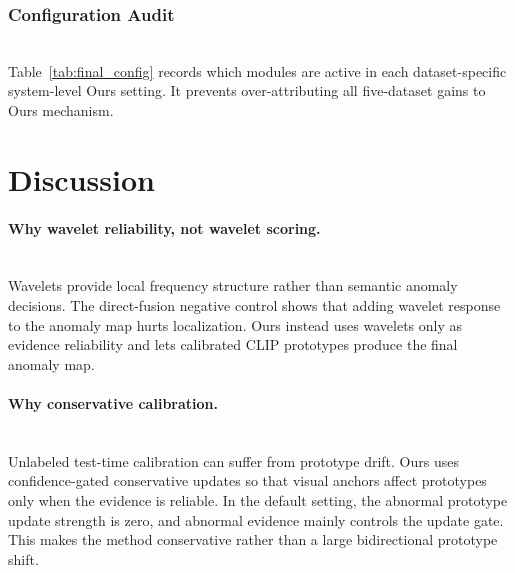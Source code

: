 \documentclass[runningheads]{llncs}
\begin{document}
\subsubsection{Configuration Audit}
\mbox{}\\
\noindent
Table~\ref{tab:final_config} records which modules are active in each dataset-specific system-level Ours setting. It prevents over-attributing all five-dataset gains to Ours mechanism.

\begin{table}[htbp]
  \centering
  \caption{Configuration audit for the five-dataset calibrated inference system.}
  \label{tab:final_config}
\end{table}

\section{Discussion}

\paragraph{Why wavelet reliability, not wavelet scoring.}\mbox{}\\
\noindent
Wavelets provide local frequency structure rather than semantic anomaly decisions. The direct-fusion negative control shows that adding wavelet response to the anomaly map hurts localization. Ours instead uses wavelets only as evidence reliability and lets calibrated CLIP prototypes produce the final anomaly map.

\paragraph{Why conservative calibration.}\mbox{}\\
\noindent
Unlabeled test-time calibration can suffer from prototype drift. Ours uses confidence-gated conservative updates so that visual anchors affect prototypes only when the evidence is reliable. In the default setting, the abnormal prototype update strength is zero, and abnormal evidence mainly controls the update gate. This makes the method conservative rather than a large bidirectional prototype shift.
\end{document}
